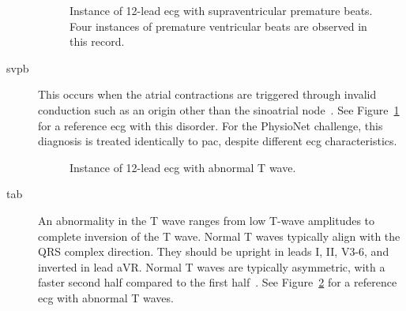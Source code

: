 \documentclass[\main/thesis.tex]{subfiles}
\begin{document}
\begin{description}
    \begin{figure}[ht]
        \centering
        \caption{Instance of 12-lead \gls{ecg} with supraventricular premature beats. Four instances of premature ventricular beats are observed in this record.}
        \label{fig:full_SVPB}
    \end{figure}
    \item[\gls{svpb}] This occurs when the atrial contractions are triggered through invalid conduction such as an origin other than the sinoatrial node~\cite{GOLDBERGER2018130}.
    See Figure~\ref{fig:full_SVPB} for a reference \gls{ecg} with this disorder.
    For the PhysioNet challenge, this diagnosis is treated identically to \gls{pac}, despite different \gls{ecg} characteristics.

    \begin{figure}[ht]
        \centering
        \caption{Instance of 12-lead \gls{ecg} with abnormal T wave.}
        \label{fig:full_TAb}
    \end{figure}
    \item[\gls{tab}]
    An abnormality in the T wave ranges from low T-wave amplitudes to complete inversion of the T wave. Normal T waves typically align with the QRS complex direction. They should be upright in leads I, II, V3-6, and inverted in lead aVR. Normal T waves are typically asymmetric, with a faster second half compared to the first half~\cite{ecg-utah-lesson}.
    See Figure~\ref{fig:full_TAb} for a reference \gls{ecg} with abnormal T waves.


\end{description}
\end{document}
